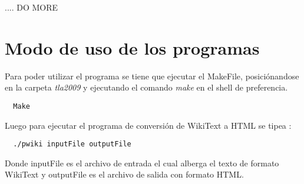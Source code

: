 \documentclass[a4paper,11pt]{article}
\begin{document}
.... DO MORE






\section {Modo de uso de los programas}

Para poder utilizar el programa se tiene que ejecutar el MakeFile, posici\'onandose en la carpeta \emph{tla2009} y ejecutando el comando \emph{make} en el shell de preferencia.\\
\begin{center}
 \begin{verbatim}
  Make
 \end{verbatim}
\end{center}

Luego para ejecutar el programa de conversi\'on de WikiText a HTML se tipea : \\

\begin{center}
 \begin{verbatim}
  ./pwiki inputFile outputFile 
 \end{verbatim}
\end{center}

Donde inputFile es el archivo de entrada el cual alberga el texto de formato WikiText y outputFile es el archivo de salida con formato HTML.\\
\end{document}
